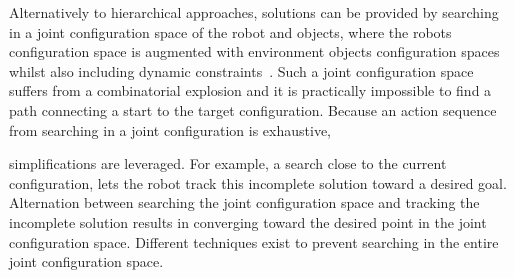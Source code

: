 Alternatively to hierarchical approaches, solutions can be provided by searching in a joint configuration space of the robot and objects, where the robots configuration space is augmented with environment objects configuration spaces whilst also including dynamic constraints~\cite{hauser_multimodal_2010,berenson_manipulation_2009,jaillet_path_2013}. Such a joint configuration space suffers from a combinatorial explosion and it is practically 
impossible to find a path connecting a start to the target configuration. Because an action sequence from searching in a joint configuration is exhaustive,


simplifications are leveraged. For example, a search close to the current configuration, lets the robot track this incomplete solution toward a desired goal. Alternation between searching the joint configuration space and tracking the incomplete solution results in converging toward the desired point in the joint configuration space. 
Different techniques exist to prevent searching in the entire joint configuration space.\bs

